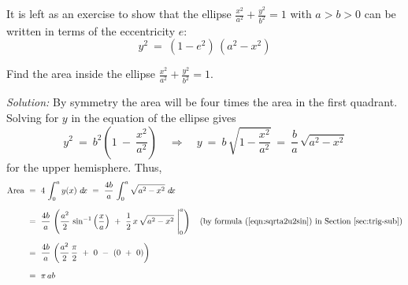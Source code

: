 It is left as an exercise to show that the ellipse
$\frac{x^2}{a^2} + \frac{y^2}{b^2} = 1$ with $a>b>0$ can be written in terms of
the eccentricity $e$:
\begin{equation}\label{eqn:ellipe}
y^2 ~=~ (1 - e^2)\,(a^2 - x^2)
\end{equation}
\newpage
\begin{exmp}\label{exmp:elliparea}
\noindent Find the area inside the ellipse
$\frac{x^2}{a^2} + \frac{y^2}{b^2} = 1$.\vspace{1mm}
\par\noindent\emph{Solution:} By symmetry the
area will be four times the area in the first quadrant. Solving for $y$ in the
equation of the ellipse gives
\[
y^2 ~=~ b^2\left(1 ~-~ \frac{x^2}{a^2}\right) \quad\Rightarrow\quad
y ~=~ b\,\sqrt{1 - \frac{x^2}{a^2}} ~=~ \frac{b}{a}\,\sqrt{a^2 - x^2}
\]
for the upper hemisphere. Thus,
\begin{align*}
\text{Area} ~&=~ 4\,\int_0^a y(x)~d\!x ~=~ \frac{4b}{a}\,\int_0^a \sqrt{a^2 - x^2}~d\!x\\[6pt]
&=~ \frac{4b}{a}\,\left(\frac{a^2}{2}\,\sin^{-1} \left(\frac{x}{a}\right) ~+~
 \frac{1}{2}\,x\,\sqrt{a^2 - x^2} ~\Biggr|_0^a\right)
 \quad\text{(by formula (\ref{eqn:sqrta2u2sin}) in Section~\ref{sec:trig-sub})}\\[6pt]
&=~\frac{4b}{a}\,\left(\frac{a^2}{2}\,\frac{\pi}{2} ~+~ 0 ~-~ (0 ~+~ 0)\right)\\[6pt]
&=~ \pi\,ab
\end{align*}
\end{exmp}\vspace{-3mm}
\divider
\vspace{2mm}

